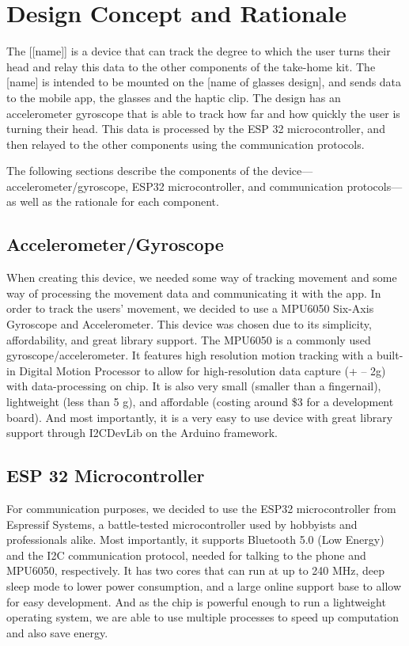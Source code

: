 \chapter{Design Concept and Rationale}
\label{chap:design}

The [[name]] is a device that can track the degree to which the user turns their head and relay this data to the other components of the take-home kit. The [name] is intended to be mounted on the [name of glasses design], and sends data to the mobile app, the glasses and the haptic clip. The design has an accelerometer gyroscope that is able to track how far and how quickly the user is turning their head. This data is processed by the ESP 32 microcontroller, and then relayed to the other components using the communication protocols.

The following sections describe the components of the device—accelerometer/gyroscope, ESP32 microcontroller, and communication protocols—as well as the rationale for each component. 


\section{Accelerometer/Gyroscope}
When creating this device, we needed some way of tracking movement and some way of processing the movement data and communicating it with the app. In order to track the users’ movement, we decided to use a MPU6050 Six-Axis Gyroscope and Accelerometer. This device was chosen due to its simplicity, affordability, and great library support.
The MPU6050 is a commonly used gyroscope/accelerometer. It features high resolution motion tracking with a built-in Digital Motion Processor to allow for high-resolution data capture (+ – 2g) with data-processing on chip. It is also very small (smaller than a fingernail), lightweight (less than 5 g), and affordable (costing around \$3 for a development board). And most importantly, it is a very easy to use device with great library support through I2CDevLib on the Arduino framework.

\section{ESP 32 Microcontroller}
For communication purposes, we decided to use the ESP32 microcontroller from Espressif Systems, a battle-tested microcontroller used by hobbyists and professionals alike. Most importantly, it supports Bluetooth 5.0 (Low Energy) and the I2C communication protocol, needed for talking to the phone and MPU6050, respectively. It has two cores that can run at up to 240 MHz, deep sleep mode to lower power consumption, and a large online support base to allow for easy development. And as the chip is powerful enough to run a lightweight operating system, we are able to use multiple processes to speed up computation and also save energy.

